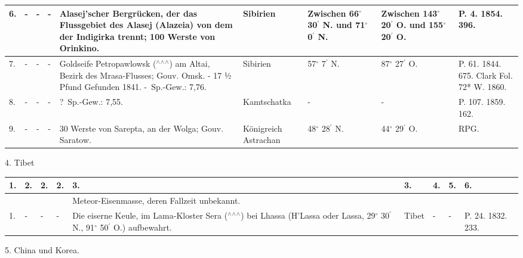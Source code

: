 \documentclass[a4paper, 8pt, oneside, polutonikogreek, german]{article}
\begin{document}
\begin{center}
\begin{longtable}{|p{3mm}|p{5mm}|p{4mm}|p{13mm}|p{22mm}|p{15mm}|p{10mm}|p{10mm}|p{13mm}|}
        6. & - & - & - & Alasej’scher Bergrücken, der das Flussgebiet des Alasej (Alazeia) von dem der Indigirka trennt; 100 Werste von Orinkino. & Sibirien & Zwischen 66$^\circ$ 30$^\prime$ N. und 71$^\circ$ 0$^\prime$ N. & Zwischen 143$^\circ$ 20$^\prime$ O. und 155$^\circ$ 20$^\prime$ O. & P. 4. 1854. 396. \\ \hline
        7. & - & - & - & Goldseife Petropawlowsk ($^\wedge$$^\wedge$$^\wedge$) am Altai, Bezirk des Mrasa-Flusses; Gouv. Omsk. - 17 ½ Pfund Gefunden 1841. - Sp.-Gew.: 7,76. & Sibirien & 57$^\circ$ 7$^\prime$ N. & 87$^\circ$ 27$^\prime$ O. & P. 61. 1844. 675. Clark Fol. 72* W. 1860. \\ \hline
        8. & - & - & - & ? Sp.-Gew.: 7,55. & Kamtschatka & - & - & P. 107. 1859. 162. \\ \hline
        9. & - & - & - & 30 Werste von Sarepta, an der Wolga; Gouv. Saratow. & Königreich Astrachan & 48$^\circ$ 28$^\prime$ N. & 44$^\circ$ 29$^\prime$ O. & RPG. \\ \hline
    \end{longtable}
\end{center}
4. Tibet
\begin{table}[H]
    \footnotesize
    \begin{tabular}{|p{3mm}|p{5mm}|p{4mm}|p{13mm}|p{22mm}|p{14mm}|p{10mm}|p{10mm}|p{13mm}|}
    \hline
        1. & 2. & 2. & 2. & 3. & 3. & 4. & 5. & 6. \\ \hline
          &   &   &   & Meteor-Eisenmasse, deren Fallzeit unbekannt. &   &   &   &   \\ \hline
        1. & - & - & - & Die eiserne Keule, im Lama-Kloster Sera ($^\wedge$$^\wedge$$^\wedge$) bei Lhassa (H’Lassa oder Lassa, 29$^\circ$ 30$^\prime$ N., 91$^\circ$ 50$^\prime$ O.) aufbewahrt. & Tibet & - & - & P. 24. 1832. 233. \\ \hline
    \end{tabular}
\end{table}
5. China und Korea.
\end{document}
